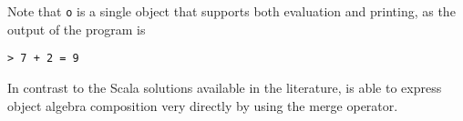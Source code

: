 
Note that \lstinline$o$ is a single object that supports both
evaluation and printing, as the output of the program is
\begin{lstlisting}
> 7 + 2 = 9
\end{lstlisting}

In contrast to the Scala solutions available in the
literature, \name is able to express object algebra
composition very directly by using the merge operator. 